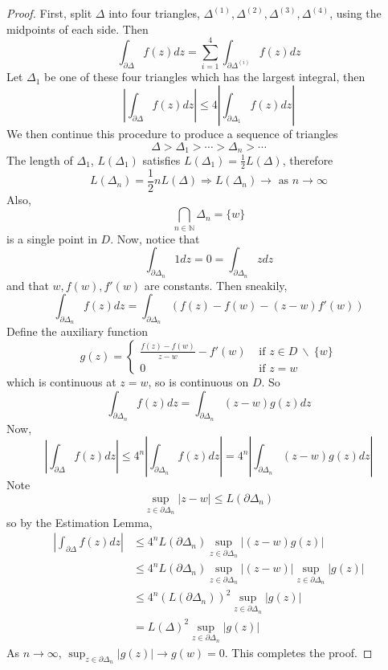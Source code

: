 \documentclass[12pt,a4paper]{article}
\theoremstyle{definition}
\begin{document}
\begin{proof}
	First, split $\Delta$ into four triangles, $\Delta^{(1)}, \Delta^{(2)}, \Delta^{(3)}, \Delta^{(4)}$, using the midpoints of each side. Then
	\[
		\int_{\partial \Delta} f(z) dz = \sum_{i = 1}^{4} \int_{\partial \Delta^{(i)}} f(z) dz
	\]
	Let $\Delta_1$ be one of these four triangles which has the largest integral, then
	\[
		\left| \int_{\partial \Delta} f(z) dz \right| \le 4 \left| \int_{\partial \Delta_1} f(z) dz \right|
	\]
	We then continue this procedure to produce a sequence of triangles
	\[
		\Delta > \Delta_1 > \cdots > \Delta_n > \cdots
	\]
	The length of $\Delta_1$, $L(\Delta_1)$ satisfies $L(\Delta_1) = \frac{1}{2} L(\Delta)$, therefore
	\[
		L(\Delta_n) = \frac{1}{2} n L(\Delta) \Longrightarrow L(\Delta_n) \rightarrow \text{ as } n \rightarrow \infty
	\]
	Also,
	\[
		\bigcap_{n \in \mathbb{N}} \Delta_n = \{ w \}
	\] is a single point in $D$. Now, notice that
	\[
		\int_{\partial \Delta_n} 1 dz = 0 = \int_{\partial \Delta_n} z dz
	\]
	and that $w, f(w), f'(w)$ are constants. Then sneakily,
	\[
		\int_{\partial \Delta_n} f(z) dz = \int_{\partial \Delta_n} \left( f(z) - f(w) - (z - w) f'(w) \right)
	\]
	Define the auxiliary function
	\[
		g(z) = \begin{cases}
			\frac{f(z) - f(w)}{z - w} - f'(w) & \text{ if } z \in D \ \backslash \ \{ w \} \\
			0 & \text{ if } z = w
		\end{cases}
	\]
	which is continuous at $z = w$, so is continuous on $D$. So
	\[
		\int_{\partial \Delta_n} f(z) dz = \int_{\partial \Delta_n} (z - w) g(z) dz
	\]
	Now,
	\[
		\left| \int_{\partial \Delta} f(z) dz \right| \le 4^n \left| \int_{\partial \Delta_n} f(z) dz \right| = 4^n \left| \int_{\partial \Delta_n} (z - w) g(z) dz \right|
	\]
	Note
	\[
		\sup_{z \in \partial \Delta_n} |z - w| \le L(\partial \Delta_n)
	\]
	so by the Estimation Lemma,
	\[
		\begin{aligned}
			\left| \int_{\partial \Delta} f(z) dz \right| & \le 4^n L(\partial \Delta_n) \sup_{z \in \partial \Delta_n} | (z - w) g(z) | \\
			& \le 4^n L(\partial \Delta_n) \sup_{z \in \partial \Delta_n} | (z - w) | \sup_{z \in \partial \Delta_n} | g(z) | \\
			& \le 4^n {(L(\partial \Delta_n))}^2 \sup_{z \in \partial \Delta_n} | g(z) | \\
			& = {L(\Delta)}^2 \sup_{z \in \partial \Delta_n} | g(z) |
		\end{aligned}
	\]
	As $n \rightarrow \infty$, $\sup_{z \in \partial \Delta_n} | g(z) | \rightarrow g(w) = 0$. This completes the proof.
\end{proof}
\end{document}
